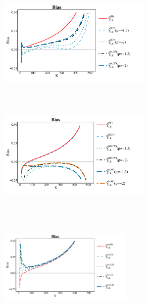 \begin{landscape}
\begin{figure}[h]
	\centering
	\begin{subfigure}[h]{0.3\linewidth}
		\includegraphics[width=7.5cm,height=5.5cm]{./plots/paper2/Bias_simulations_F21_H.pdf}
	\end{subfigure}
	\hspace{\fill}
	\begin{subfigure}[h]{0.3\linewidth}
		\includegraphics[width=7.5cm,height=5.5cm]{./plots/paper2/Bias_simulations_F21_W.pdf}
	\end{subfigure}
	\hspace{\fill}
	\begin{subfigure}[h]{0.3\linewidth}
		\includegraphics[width=6.5cm,height=5.5cm]{./plots/paper2/Bias_simulations_F21_B.pdf}
	\end{subfigure}
	\hspace{\fill}
	\begin{subfigure}[h]{0.3\linewidth}

\end{subfigure}
\end{figure}
\end{landscape}

